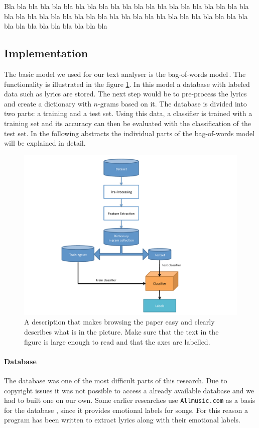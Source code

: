 \documentclass[a4paper,12pt]{article}
\begin{document}
Bla bla bla bla bla bla bla bla bla bla bla bla bla bla bla bla bla 
bla bla bla bla bla bla bla bla bla bla bla bla bla bla bla bla bla 
bla bla bla bla bla bla bla bla bla bla bla bla bla bla bla bla bla 

\subsection{Implementation}
\label{sec:impl}

The basic model we used for our text analyser is the bag-of-words model\,\cite{Mitchell}. The functionality is illustrated in the figure \ref{fig:bagOfWords}. In this model a database with labeled data such as lyrics are stored. The next step would be to pre-process the lyrics and create a dictionary with $n$-grams based on it. The database is divided into two parts: a training and a test set. Using this data, a classifier is trained with a training set and its accuracy can then be evaluated with the classification of the test set. In the following abstracts the individual parts of the bag-of-words model will be explained in detail. 

\begin{figure}
\centering
\includegraphics[width=0.8\linewidth]{flowChartBagOfWords}
\caption{A description that makes browsing the paper easy and clearly 
describes what is in the picture. Make sure that the text in the figure 
is large enough to read and that the axes are labelled.}
\label{fig:bagOfWords}
\end{figure}

\paragraph{Database} The database was one of the most difficult parts of this research. Due to copyright issues it was not possible to access a already available database and we had to built one on our own. Some earlier researches use \texttt{Allmusic.com} as a basis for the database \cite{kim2010music}, since it provides emotional labels for songs. For this reason a program has been written to extract lyrics along with their emotional labels. 
\end{document}
